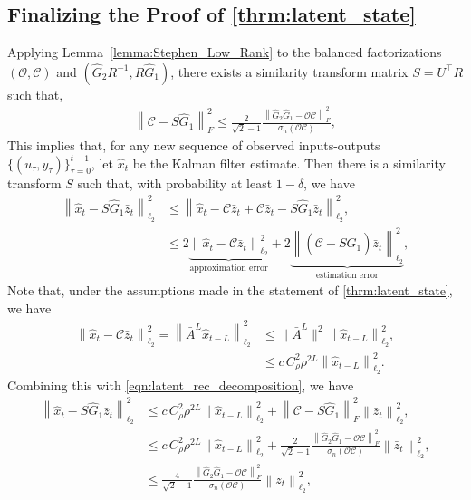 \documentclass[11pt]{article}
\newcommand{\Abar}{\bar{A}}
\newcommand{\ybar}{\bar{y}}
\newcommand{\zbar}{\bar{z}}
\newcommand{\xtil}{\hat{x}}
\newcommand{\Ccal}{\mathcal{C}}
\newcommand{\Ocal}{\mathcal{O}}
\newcommand{\tn}[1]{\left\|{#1}\right\|_{\ell_2}}
\newcommand{\nn}{\nonumber}
\newcommand{\tf}[1]{\left\|{#1}\right\|_{F}}
\newcommand{\leqsym}[1]{\stackrel{\text{(#1)}}{\leq}}
\newcommand{\norm}[1]{\|{#1} \|}
\newcommand{\T}{\top}
\newcommand{\fronorm}[1]{\left\|#1\right\|_{F}}
\newcommand{\<}{\langle}
\renewcommand{\>}{\rangle}
\numberwithin{equation}{section}
\begin{document}
\subsection{Finalizing the Proof of \ref{thrm:latent_state}}
Applying Lemma~\ref{lemma:Stephen_Low_Rank} to the balanced factorizations $(\Ocal, \Ccal)$ and $(\hat{G}_2R^{-1}, R\hat{G}_1)$, there exists a similarity transform matrix $S= U^\T R$ such that,
\begin{align}
	\tf{\Ccal - S\hat{G}_1}^2 \leq \frac{2}{\sqrt{2} - 1} \frac{\fronorm{\hat{G}_2 \hat{G}_1 - \Ocal \Ccal}^2}{\sigma_{n}\left(\Ocal \Ccal\right)},
\end{align}
This implies that, for any new sequence of observed inputs-outputs $\{(u_\tau,y_\tau)\}_{\tau = 0}^{t-1}$, let $\xtil_t$ be the Kalman filter estimate. Then
there is a similarity transform $S$ such that, with probability at least $1-\delta$, we have 
\begin{align}
	\tn{\xtil_t - S \hat{G}_1 \zbar_{t}}^2 &\leq \tn{\xtil_t - \Ccal\zbar_t + \Ccal \zbar_t -  S \hat{G}_1 \zbar_{t}}^2, \nn \\
	& \leq 2\underbrace{\tn{\xtil_t - \Ccal\zbar_t}^2}_{\text{approximation error}} + 2\underbrace{\tn{\left(\Ccal - S \hat{G}_1\right)\zbar_t}^2}_{\text{estimation error}}, \label{eqn:latent_rec_decomposition} 
\end{align}
Note that, under the assumptions made in the statement of \ref{thrm:latent_state}, 
we have
\begin{align}
	\tn{\xtil_t - \Ccal\zbar_t}^2 = \tn{\Abar^L \xtil_{t-L}}^2 &\leq \norm{\Abar^L}^2 \tn{\xtil_{t-L}}^2, \nn \\
	& \leq c\,C_{\rho}^2 \rho^{2L}\tn{\xtil_{t-L}}^2. \label{eqn:prop1_proof_place}
\end{align}
Combining this with \eqref{eqn:latent_rec_decomposition}, we have
\begin{align}
	\tn{\xtil_t - S \hat{G}_1 \zbar_{t}}^2 &\leq c\,C_{\rho}^2 \rho^{2L}\tn{\xtil_{t-L}}^2 + \tf{\Ccal - S \hat{G}_1}^2\tn{\zbar_t}^2, \nn \\
	& \leq c\,C_{\rho}^2 \rho^{2L}\tn{\xtil_{t-L}}^2 +\frac{2}{\sqrt{2} - 1} \frac{\fronorm{\hat{G}_2 \hat{G}_1 - \Ocal \Ccal}^2}{\sigma_{n}\left(\Ocal \Ccal\right)}
	\tn{\zbar_t}^2, \nn \\
	&\leq \frac{4}{\sqrt{2} - 1} \frac{\fronorm{\hat{G}_2 \hat{G}_1 - \Ocal \Ccal}^2}{\sigma_{n}\left(\Ocal \Ccal\right)}
	\tn{\zbar_t}^2,
\end{align}
\end{document}
